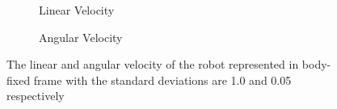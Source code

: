 \documentclass[letterpaper,12pt]{article}
\begin{document}
\begin{figure}[H]
    \centering
    \begin{subfigure}[b]{8.cm}
        \centering
        \captionsetup{justification=centering}
        \caption{Linear Velocity}
        \label{fig:kermit}
    \end{subfigure}
    \begin{subfigure}[b]{8.cm}
        \centering
        \captionsetup{justification=centering}
        \caption{Angular Velocity}
        \label{fig:rana}
    \end{subfigure}
\caption{The linear and angular velocity of the robot represented in body-fixed frame with the standard deviations are 1.0 and 0.05 respectively}
\label{fig:map2_5}
\end{figure}
\end{document}
